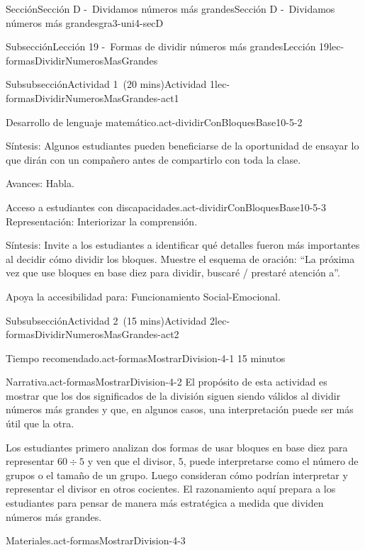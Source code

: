 \documentclass[oneside,10pt,]{article}
\begin{document}
\begin{sectionptx}{Sección}{Sección D -~Dividamos números más grandes}{}{Sección D -~Dividamos números más grandes}{}{}{gra3-uni4-secD}
\begin{subsectionptx}{Subsección}{Lección 19 -~Formas de dividir números más grandes}{}{Lección 19}{}{}{lec-formasDividirNumerosMasGrandes}
\begin{subsubsectionptx}{Subsubsección}{Actividad 1~(20 mins)}{}{Actividad 1}{}{}{lec-formasDividirNumerosMasGrandes-act1}
\begin{paragraphs}{Desarrollo de lenguaje matemático.}{act-dividirConBloquesBase10-5-2}
\par
Síntesis: Algunos estudiantes pueden beneficiarse de la oportunidad de ensayar lo que dirán con un compañero antes de compartirlo con toda la clase.%
\par
Avances: Habla.%
\end{paragraphs}%
\begin{paragraphs}{Acceso a estudiantes con discapacidades.}{act-dividirConBloquesBase10-5-3}%
Representación: Interiorizar la comprensión.%
\par
Síntesis: Invite a los estudiantes a identificar qué detalles fueron más importantes al decidir cómo dividir los bloques. Muestre el esquema de oración: ``La próxima vez que use bloques en base diez para dividir, buscaré \slash{} prestaré atención a''.%
\par
Apoya la accesibilidad para: Funcionamiento Social-Emocional.%
\end{paragraphs}%
\end{subsubsectionptx}
%
%
\typeout{************************************************}
\typeout{************************************************}
%
\begin{subsubsectionptx}{Subsubsección}{Actividad 2~(15 mins)}{}{Actividad 2}{}{}{lec-formasDividirNumerosMasGrandes-act2}
\par
\begin{paragraphs}{Tiempo recomendado.}{act-formasMostrarDivision-4-1}%
15 minutos%
\end{paragraphs}%
\begin{paragraphs}{Narrativa.}{act-formasMostrarDivision-4-2}%
El propósito de esta actividad es mostrar que los dos significados de la división siguen siendo válidos al dividir números más grandes y que, en algunos casos, una interpretación puede ser más útil que la otra.%
\par
Los estudiantes primero analizan dos formas de usar bloques en base diez para representar \(60 \div 5\) y ven que el divisor, \(5\), puede interpretarse como el número de grupos o el tamaño de un grupo. Luego consideran cómo podrían interpretar y representar el divisor en otros cocientes. El razonamiento aquí prepara a los estudiantes para pensar de manera más estratégica a medida que dividen números más grandes.%
\end{paragraphs}%
\begin{paragraphs}{Materiales.}{act-formasMostrarDivision-4-3}%
%
\begin{itemize}[label=\textbullet]

\end{itemize}
\end{paragraphs}
\end{subsubsectionptx}
\end{subsectionptx}
\end{sectionptx}
\end{document}
